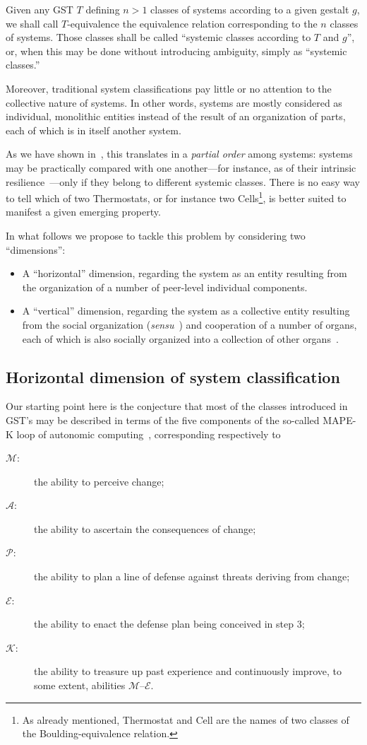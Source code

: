 \documentclass[twocolumn]{svjour3}
\def\M{\hbox{$\mathcal{M}$}}
\def\A{\hbox{$\mathcal{A}$}}
\def\P{\hbox{$\mathcal{P}$}}
\def\E{\hbox{$\mathcal{E}$}}
\def\K{\hbox{$\mathcal{K}$}}
\begin{document}
\begin{definition}
Given any GST $T$ defining $n>1$ classes of systems
according to a given gestalt $g$, we shall call $T$-equivalence the equivalence relation
corresponding to the $n$ classes of systems. Those classes shall be called ``systemic classes according to $T$ and $g$'',
or, when this may be done without introducing ambiguity, simply as ``systemic classes.''
\end{definition}

Moreover, traditional system classifications pay little or no attention to the collective nature
of systems. In other words, systems are mostly considered
as individual, monolithic entities instead of the result of an organization of parts,
each of which is in itself another system.

As we have shown in~\cite{DF14b}, this translates in a \emph{partial order\/} among systems:
systems may be practically compared with one another---for instance, as of their intrinsic
resilience~\cite{DF15b}---only if they belong to different systemic classes. There is no easy
way to tell which of two Thermostats, or for instance two Cells\footnote{As already mentioned,
Thermostat and Cell are the names of two classes of the Boulding-equivalence relation.},
is better suited to manifest a given emerging property.

In what follows we propose to tackle this problem by considering two ``dimensions'':
\begin{itemize}
\item A ``horizontal'' dimension, regarding the system as an entity
resulting from the organization of a number of peer-level individual components.
\item A ``vertical'' dimension, regarding the system as a collective entity
resulting from the social organization (\emph{sensu}~\cite{Bou56}) and cooperation of a number of organs,
each of which is also socially organized into a collection of other organs~\cite{DBLP:journals/corr/Florio15c}.
\end{itemize}


\subsection{Horizontal dimension of system classification}\label{s:clas:hor}
Our starting point here is the conjecture that most of the classes introduced
in GST's may be described in terms of the five 
components of the so-called MAPE-K loop of autonomic
computing~\cite{KeCh:2003}, corresponding respectively to
\begin{description}
\item[\M:] the ability to perceive change;
\item[\A:] the ability to ascertain the consequences of change;
\item[\P:] the ability to plan a line of defense against threats deriving from change;
\item[\E:] the ability to enact the defense plan being conceived in step 3;
\item[\K:] the ability to treasure up past experience and continuously improve, to some extent, 
abilities \M--\E.
\end{description}
\end{document}
